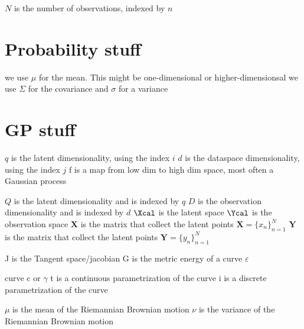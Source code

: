 

$N$ is the number of observations, indexed by $n$

\section{Probability stuff}
we use $\mu$ for the mean. This might be one-dimensional or higher-dimensionsal
we use $\Sigma$ for the covariance and $\sigma$ for a variance

\section{GP stuff}
$q$ is the latent dimensionality, using the index $i$
$d$ is the dataspace dimensionality, using the index $j$
f is a map from low dim to high dim space, most often a Gaussian process


$Q$ is the latent dimensionality and is indexed by $q$
$D$ is the observation dimensionality and is indexed by $d$
$\Xcal$ is the latent space 
$\Ycal$ is the observation space 
$\mathbf{X}$ is the matrix that collect the latent points $\mathbf{X} = \{x_n\}_{n=1}^N$
$\mathbf{Y}$ is the matrix that collect the latent points $\mathbf{Y} = \{y_n\}_{n=1}^N$



J is the Tangent space/jacobian
G is the metric
energy of a curve $\varepsilon$

curve c or $\gamma$
t is a continuous parametrization of the curve
i is a discrete parametrization of the curve



$\mu$ is the mean of the Riemannian Brownian motion
$\nu$ is the variance of the Riemannian Brownian motion




